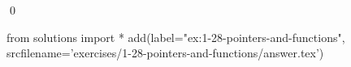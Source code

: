 
\begin{ex}
  \label{ex:1-28-pointers-and-functions}
  
  \qed
\end{ex}
\begin{python0}
from solutions import *
add(label="ex:1-28-pointers-and-functions",
    srcfilename='exercises/1-28-pointers-and-functions/answer.tex')
\end{python0}
